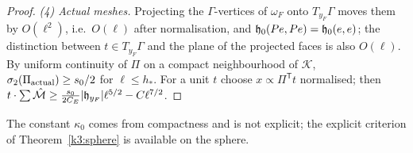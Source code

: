 \begin{proof}
\emph{(4) Actual meshes.} Projecting the $\Gamma$-vertices of $\omega_F$ onto $T_{y_F}\Gamma$ moves them by $O(\ell^2)$, i.e.\ $O(\ell)$ after normalisation, and $\mathfrak h_0(Pe,Pe)=\mathfrak h_0(e,e)$; the distinction between $t\in T_{y_F}\Gamma$ and the plane of the projected faces is also $O(\ell)$. By uniform continuity of $\Pi$ on a compact neighbourhood of $\mathcal K$, $\sigma_2(\Pi_{\rm actual})\ge s_0/2$ for $\ell\le h_\ast$. For a unit $t$ choose $x\propto\Pi^{\mathsf T}t$ normalised; then $t\cdot\sum\hat{\mathcal M}\ge\frac{s_0}{2C_E}|\mathfrak h_{y_F}|\ell^{5/2}-C\ell^{7/2}$.
\end{proof}
The constant $\kappa_0$ comes from compactness and is not explicit; the explicit criterion of Theorem~\ref{k3:sphere} is available on the sphere.
